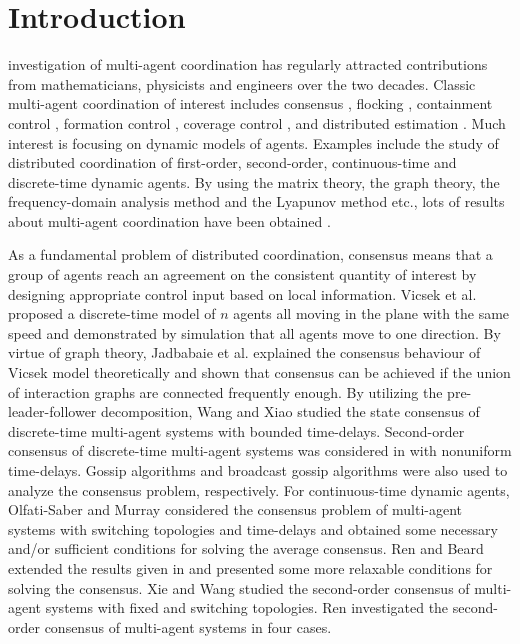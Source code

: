 \documentclass[12pt,draftcls,onecolumn]{IEEEtran}
\begin{document}
\section{Introduction}\label{s-introduction}

 investigation of multi-agent coordination has regularly attracted contributions from mathematicians, physicists and engineers over the two decades. Classic multi-agent coordination of interest includes consensus \cite{Olfati-Saber07}, flocking \cite{Saber06}, containment control \cite{cao11},  formation control \cite{xiao09}, coverage control \cite{cortes02}, and distributed estimation \cite{yang2008}. Much interest is focusing on dynamic models of agents. Examples include the study of distributed coordination of first-order, second-order, continuous-time and discrete-time dynamic agents. By using the matrix theory, the graph theory, the frequency-domain analysis method and the Lyapunov method etc., lots of results about multi-agent coordination have been obtained \cite{Renbook08,Xiao08-1,ji09,su14}.

As a fundamental problem of distributed coordination, consensus means that a group of agents reach an agreement on the consistent quantity of interest by designing appropriate control input based on local information. Vicsek et al. \cite{vicsek95} proposed a discrete-time model of $n$ agents all moving in the plane with the same speed and demonstrated by simulation that all agents move to one direction. By virtue of graph theory, Jadbabaie et al. \cite{jabdabaie03} explained the consensus behaviour of Vicsek model theoretically and shown that consensus can be achieved if the union of interaction graphs are connected frequently enough. By utilizing the pre-leader-follower decomposition, Wang and Xiao \cite{xiao06-1} studied the state consensus of discrete-time multi-agent systems with bounded time-delays. Second-order consensus of discrete-time multi-agent systems was considered in \cite{lin09} with nonuniform time-delays. Gossip algorithms \cite{boyd06} and broadcast gossip algorithms \cite{aysal09} were also used to analyze the consensus problem, respectively. For continuous-time dynamic agents, Olfati-Saber and Murray \cite{sabertac04} considered the consensus problem of multi-agent systems with switching topologies and time-delays and obtained some necessary and/or sufficient conditions for solving the average consensus. Ren and Beard \cite{ren05} extended the results given in \cite{sabertac04} and presented some more relaxable conditions for solving the consensus. Xie and Wang \cite{Xie07} studied the second-order consensus of multi-agent systems with fixed and switching topologies. Ren \cite{Ren08} investigated the second-order consensus of multi-agent systems in four cases.
\end{document}
